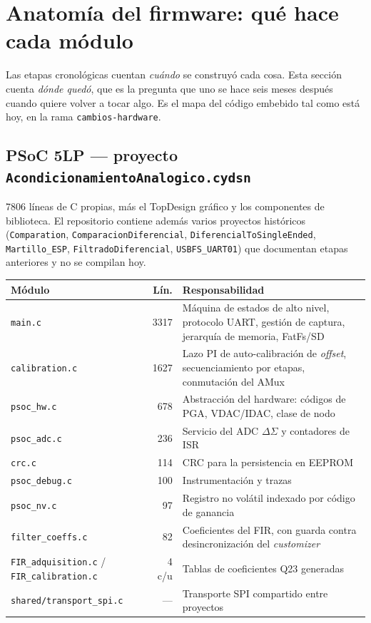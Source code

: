 \section{Anatom\'ia del firmware: qu\'e hace cada m\'odulo}
\label{sec:anatomia-firmware}

Las etapas cronol\'ogicas cuentan \emph{cu\'ando} se construy\'o cada cosa. Esta
secci\'on cuenta \emph{d\'onde qued\'o}, que es la pregunta que uno se hace seis
meses despu\'es cuando quiere volver a tocar algo. Es el mapa del c\'odigo
embebido tal como est\'a hoy, en la rama \texttt{cambios-hardware}.

\subsection{PSoC 5LP --- proyecto \texttt{AcondicionamientoAnalogico.cydsn}}

\num{7806} l\'ineas de C propias, m\'as el TopDesign gr\'afico y los componentes
de biblioteca. El repositorio contiene adem\'as varios proyectos hist\'oricos
(\texttt{Comparation}, \texttt{ComparacionDiferencial},
\texttt{DiferencialToSingleEnded}, \texttt{Martillo\_ESP},
\texttt{FiltradoDiferencial}, \texttt{USBFS\_UART01}) que documentan etapas
anteriores y no se compilan hoy.

\begin{center}\footnotesize
\begin{tabularx}{\textwidth}{@{}l r X@{}}
\toprule
M\'odulo & L\'in. & Responsabilidad \\
\midrule
\texttt{main.c} & 3317 & M\'aquina de estados de alto nivel, protocolo UART, gesti\'on de captura, jerarqu\'ia de memoria, FatFs/SD \\
\texttt{calibration.c} & 1627 & Lazo PI de auto-calibraci\'on de \emph{offset}, secuenciamiento por etapas, conmutaci\'on del AMux \\
\texttt{psoc\_hw.c} & 678 & Abstracci\'on del hardware: c\'odigos de PGA, VDAC/IDAC, clase de nodo \\
\texttt{psoc\_adc.c} & 236 & Servicio del ADC $\Delta\Sigma$ y contadores de ISR \\
\texttt{crc.c} & 114 & CRC para la persistencia en EEPROM \\
\texttt{psoc\_debug.c} & 100 & Instrumentaci\'on y trazas \\
\texttt{psoc\_nv.c} & 97 & Registro no vol\'atil indexado por c\'odigo de ganancia \\
\texttt{filter\_coeffs.c} & 82 & Coeficientes del FIR, con guarda contra desincronizaci\'on del \emph{customizer} \\
\texttt{FIR\_adquisition.c} / \texttt{FIR\_calibration.c} & 4 c/u & Tablas de coeficientes Q23 generadas \\
\texttt{shared/transport\_spi.c} & --- & Transporte SPI compartido entre proyectos \\
\bottomrule
\end{tabularx}
\end{center}

